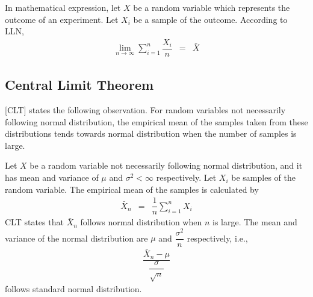 In mathematical expression, let $X$ be a random variable which represents the outcome of an experiment. Let $X_i$ be a sample of the outcome. According to LLN,
\begin{eqnarray}
	\lim_{n\rightarrow\infty} \sum_{i=1}^{n}\dfrac{X_i}{n} &=& \bar{X} \nonumber
\end{eqnarray}

\subsection{Central Limit Theorem}

[CLT] states the following observation. For  random variables not necessarily following normal distribution, the empirical mean of the samples taken from these distributions tends towards normal distribution when the number of samples is large.

Let $X$ be a random variable not necessarily following normal distribution, and it has mean and variance of $\mu$ and $\sigma^2<\infty$ respectively. Let $X_i$ be samples of the random variable. The empirical mean of the samples is calculated by
\begin{eqnarray}
	\bar{X}_n &=& \dfrac{1}{n}\sum_{i=1}^{n}X_i \nonumber
\end{eqnarray}
CLT states that $\bar{X}_n$ follows normal distribution when $n$ is large. The mean and variance of the normal distribution are $\mu$ and $\dfrac{\sigma^2}{n}$ respectively, i.e.,
\begin{eqnarray}
	\dfrac{\bar{X}_n-\mu}{\dfrac{\sigma}{\sqrt{n}}} \nonumber
\end{eqnarray}
follows standard normal distribution. 
